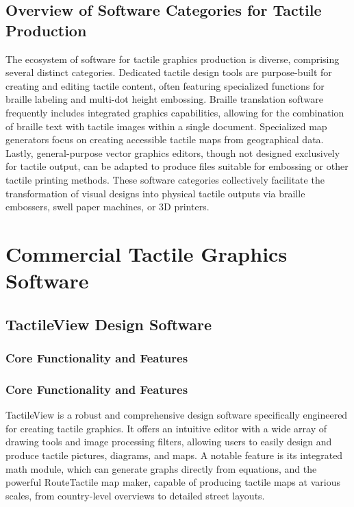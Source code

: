\subsection{Overview of Software Categories for Tactile Production}

The ecosystem of software for tactile graphics production is diverse, comprising several distinct categories. Dedicated tactile design tools are purpose-built for creating and editing tactile content, often featuring specialized functions for braille labeling and multi-dot height embossing. Braille translation software frequently includes integrated graphics capabilities, allowing for the combination of braille text with tactile images within a single document. Specialized map generators focus on creating accessible tactile maps from geographical data. Lastly, general-purpose vector graphics editors, though not designed exclusively for tactile output, can be adapted to produce files suitable for embossing or other tactile printing methods. These software categories collectively facilitate the transformation of visual designs into physical tactile outputs via braille embossers, swell paper machines, or 3D printers. \cite{TouchMapper,DuxburyDetails,TactileViewIrie,NYUWorkflow,GetBraille,ProBlind,DuxburyProducts,BlindSVG}

\section{Commercial Tactile Graphics Software}

\subsection{TactileView Design Software}

\subsubsection{Core Functionality and Features}

\subsubsection{Core Functionality and Features}

TactileView is a robust and comprehensive design software specifically engineered for creating tactile graphics. It offers an intuitive editor with a wide array of drawing tools and image processing filters, allowing users to easily design and produce tactile pictures, diagrams, and maps. \cite{DuxburyDetails,BlindSVG} A notable feature is its integrated math module, which can generate graphs directly from equations, and the powerful RouteTactile map maker, capable of producing tactile maps at various scales, from country-level overviews to detailed street layouts. \cite{DuxburyDetails,BlindSVG,DuxburyNews}

